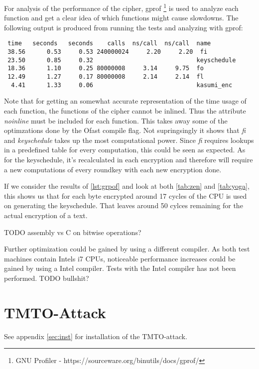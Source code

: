 For analysis of the performance of the cipher, gprof \footnote{GNU
  Profiler - https://sourceware.org/binutils/docs/gprof/} is used to
analyze each function and get a clear idea of which functions might
cause slowdowns. The following output is produced from running the
tests and analyzing with gprof:
\begin{lstlisting}[caption=Gprof output,captionpos=b,label=lst:grpof]
    %   cumulative   self              self     total
 time   seconds   seconds    calls  ns/call  ns/call  name
 38.56      0.53     0.53 240000024     2.20     2.20  fi
 23.50      0.85     0.32                             keyschedule
 18.36      1.10     0.25 80000008     3.14     9.75  fo
 12.49      1.27     0.17 80000008     2.14     2.14  fl
  4.41      1.33     0.06                             kasumi_enc
\end{lstlisting}
Note that for getting an somewhat accurate representation of the time usage of
each function, the functions of the cipher cannot be inlined. Thus the
attribute \textit{noinline} must be included for each function. This
takes away some of the optimzations done by the Ofast compile
flag. Not supringsingly it shows that \textit{fi} and
\textit{keyschedule} takes up the most computational
power. Since \textit{fi} requires lookups in a predefined table for every computation, this
could be seen as expected. As for the keyschedule, it's recalculated
in each encryption and therefore will require a new computations of
every roundkey with each new encryption done.

If we consider the results of \ref{lst:grpof} and look at both
\ref{tab:zen} and \ref{tab:yoga}, this shows us that for each byte
encrypted around 17 cycles of the CPU is used on generating the
keyschedule. That leaves around 50 cylces remaining for the actual
encryption of a text.

TODO assembly vs C on bitwise operations?

Further optimization could be gained by using a different compiler. As
both test machines contain Intels i7 CPUs, noticeable performance
increases could be gained by using a Intel compiler. Tests with the
Intel compiler has not been performed. TODO bullshit?


\section{TMTO-Attack}

See appendix \ref{sec:inst} for installation of the TMTO-attack.


